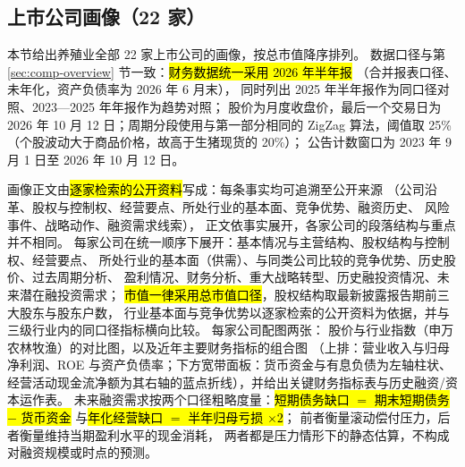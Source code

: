 \subsection{上市公司画像（\num{22} 家）}
\label{sec:co-breeding}

本节给出养殖业全部 \num{22} 家上市公司的画像，按总市值降序排列。
数据口径与第 \ref{sec:comp-overview} 节一致：\hl{财务数据统一采用 2026 年半年报}
（合并报表口径、未年化，资产负债率为 2026 年 6 月末），
同时列出 2025 年半年报作为同口径对照、2023---2025 年年报作为趋势对照；
股价为月度收盘价，最后一个交易日为 2026 年 10 月 12 日；周期分段使用与第一部分相同的
ZigZag 算法，阈值取 25\%（个股波动大于商品价格，故高于生猪现货的 20\%）；
公告计数窗口为 2023 年 9 月 1 日至 2026 年 10 月 12 日。

画像正文由\hl{逐家检索的公开资料}写成：每条事实均可追溯至公开来源
（公司沿革、股权与控制权、经营要点、所处行业的基本面、竞争优势、融资历史、
风险事件、战略动作、融资需求线索），
正文依事实展开，各家公司的段落结构与重点并不相同。
每家公司在统一顺序下展开：基本情况与主营结构、股权结构与控制权、经营要点、
所处行业的基本面（供需）、与同类公司比较的竞争优势、历史股价、过去周期分析、
盈利情况、财务分析、重大战略转型、历史融投资情况、未来潜在融投资需求；
\hl{市值一律采用总市值口径}，股权结构取最新披露报告期前三大股东与股东户数，
行业基本面与竞争优势以逐家检索的公开资料为依据，并与三级行业内的同口径指标横向比较。
每家公司配图两张：
股价与行业指数（申万农林牧渔）的对比图，以及近年主要财务指标的组合图
（上排：营业收入与归母净利润、ROE 与资产负债率；下方宽带面板：货币资金与有息负债为左轴柱状、
经营活动现金流净额为其右轴的蓝点折线），并给出关键财务指标表与历史融资/资本运作表。
未来融资需求按两个口径粗略度量：\hl{短期债务缺口 $=$ 期末短期债务 $-$ 货币资金}
与\hl{年化经营缺口 $=$ 半年归母亏损 $\times 2$}；
前者衡量滚动偿付压力，后者衡量维持当期盈利水平的现金消耗，
两者都是压力情形下的静态估算，不构成对融资规模或时点的预测。


